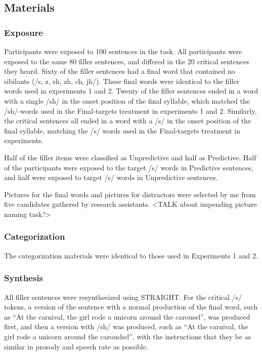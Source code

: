 \subsection{Materials}

\subsubsection{Exposure}

Participants were exposed to 100 sentences in the task.  All participants were exposed to the same 80 filler sentences, and differed in the 20 critical sentences they heard.  Sixty of the filler sentences had a final word that contained no sibilants  (/s, z, sh, zh, ch, jh/).  These final words were identical to the filler words used in experiments 1 and 2.  Twenty of the filler sentences ended in a word with a single /sh/ in the onset position of the final syllable, which matched the /sh/-words used in the Final-targets treatment in experiments 1 and 2.  Similarly, the critical sentences all ended in a word with a /s/ in the onset position of the final syllable, matching the /s/ words used in the Final-targets treatment in experiments.

Half of the filler items were classified as Unpredictive and half as Predictive.  Half of the participants were exposed to the target /s/ words in Predictive sentences, and half were exposed to target /s/ words in Unpredictive sentences.  

Pictures for the final words and pictures for distractors were selected by me from five candidates gathered by research assistants.  <TALK about impending picture naming task?>


\subsubsection{Categorization}

The categorization materials were identical to those used in Experiments 1 and 2.
	

\subsubsection{Synthesis}

All filler sentences were resynthesized using STRAIGHT.  For the critical /s/ tokens, a version of the sentence with a normal production of the final word, such as ``At the carnival, the girl rode a unicorn around the carousel'', was produced first, and then a version with /sh/ was produced, such as ``At the carnival, the girl rode a unicorn around the caroushel'', with the instructions that they be as similar in prosody and speech rate as possible.


